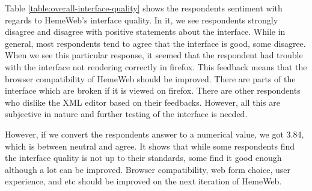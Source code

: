 Table \ref{table:overall-interface-quality} shows the respondents sentiment with regards to HemeWeb's interface quality. In it, we see respondents strongly disagree and disagree with positive statements about the interface. While in general, most respondents tend to agree that the interface is good, some disagree. When we see this particular response, it seemed that the respondent had trouble with the interface not rendering correctly in firefox. This feedback means that the browser compatibility of HemeWeb should be improved. There are parts of the interface which are broken if it is viewed on firefox. There are other respondents who dislike the XML editor based on their feedbacks. However, all this are subjective in nature and further testing of the interface is needed.

However, if we convert the respondents answer to a numerical value, we got 3.84, which is between neutral and agree. It shows that while some respondents find the interface quality is not up to their standards, some find it good enough although a lot can be improved. Browser compatibility, web form choice, user experience, and etc should be improved on the next iteration of HemeWeb.



\begin{center}
\label{table:overall-satisfaction}
\end{center}
\vspace{0.5cm}

